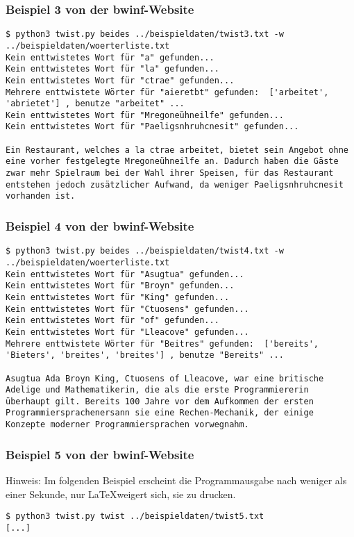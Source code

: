 \documentclass[a4paper,10pt,ngerman]{scrartcl}
\begin{document}
\subsubsection{Beispiel 3 von der bwinf-Website}
\begin{lstlisting}[breaklines=true]
$ python3 twist.py beides ../beispieldaten/twist3.txt -w ../beispieldaten/woerterliste.txt
Kein enttwistetes Wort für "a" gefunden...
Kein enttwistetes Wort für "la" gefunden...
Kein enttwistetes Wort für "ctrae" gefunden...
Mehrere enttwistete Wörter für "aieretbt" gefunden:  ['arbeitet', 'abrietet'] , benutze "arbeitet" ...
Kein enttwistetes Wort für "Mregoneühneilfe" gefunden...
Kein enttwistetes Wort für "Paeligsnhruhcnesit" gefunden...

Ein Restaurant, welches a la ctrae arbeitet, bietet sein Angebot ohne eine vorher festgelegte Mregoneühneilfe an. Dadurch haben die Gäste zwar mehr Spielraum bei der Wahl ihrer Speisen, für das Restaurant entstehen jedoch zusätzlicher Aufwand, da weniger Paeligsnhruhcnesit vorhanden ist.
\end{lstlisting}


\subsubsection{Beispiel 4 von der bwinf-Website}
\begin{lstlisting}[breaklines=true]
$ python3 twist.py beides ../beispieldaten/twist4.txt -w ../beispieldaten/woerterliste.txt
Kein enttwistetes Wort für "Asugtua" gefunden...
Kein enttwistetes Wort für "Broyn" gefunden...
Kein enttwistetes Wort für "King" gefunden...
Kein enttwistetes Wort für "Ctuosens" gefunden...
Kein enttwistetes Wort für "of" gefunden...
Kein enttwistetes Wort für "Lleacove" gefunden...
Mehrere enttwistete Wörter für "Beitres" gefunden:  ['bereits', 'Bieters', 'breites', 'breites'] , benutze "Bereits" ...

Asugtua Ada Broyn King, Ctuosens of Lleacove, war eine britische Adelige und Mathematikerin, die als die erste Programmiererin überhaupt gilt. Bereits 100 Jahre vor dem Aufkommen der ersten Programmiersprachenersann sie eine Rechen-Mechanik, der einige Konzepte moderner Programmiersprachen vorwegnahm.
\end{lstlisting}


\subsubsection{Beispiel 5 von der bwinf-Website}
Hinweis: Im folgenden Beispiel erscheint die Programmausgabe nach weniger als einer Sekunde, nur \LaTeX weigert sich, sie zu drucken.
\begin{lstlisting}[breaklines=true]
$ python3 twist.py twist ../beispieldaten/twist5.txt
[...]
\end{lstlisting}
\end{document}
